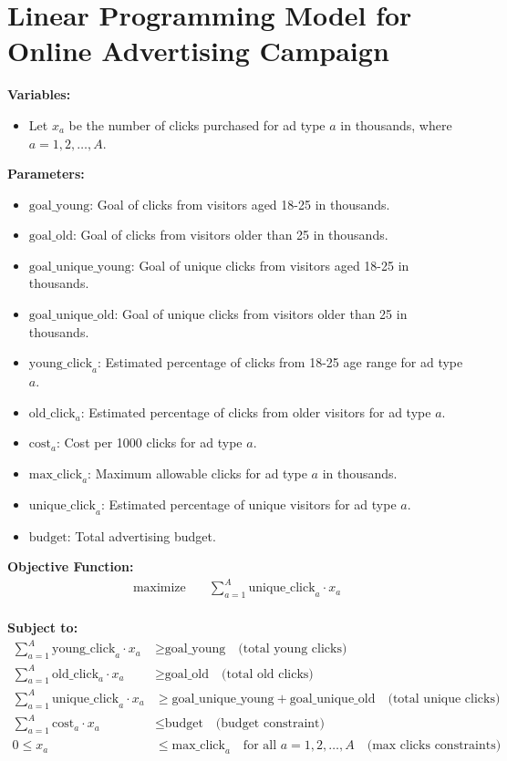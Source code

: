 \documentclass{article}
\begin{document}
\section*{Linear Programming Model for Online Advertising Campaign}

\textbf{Variables:}
\begin{itemize}
    \item Let \( x_a \) be the number of clicks purchased for ad type \( a \) in thousands, where \( a = 1, 2, \ldots, A \).
\end{itemize}

\textbf{Parameters:}
\begin{itemize}
    \item \( \text{goal\_young} \): Goal of clicks from visitors aged 18-25 in thousands.
    \item \( \text{goal\_old} \): Goal of clicks from visitors older than 25 in thousands.
    \item \( \text{goal\_unique\_young} \): Goal of unique clicks from visitors aged 18-25 in thousands.
    \item \( \text{goal\_unique\_old} \): Goal of unique clicks from visitors older than 25 in thousands.
    \item \( \text{young\_click}_{a} \): Estimated percentage of clicks from 18-25 age range for ad type \( a \).
    \item \( \text{old\_click}_{a} \): Estimated percentage of clicks from older visitors for ad type \( a \).
    \item \( \text{cost}_{a} \): Cost per 1000 clicks for ad type \( a \).
    \item \( \text{max\_click}_{a} \): Maximum allowable clicks for ad type \( a \) in thousands.
    \item \( \text{unique\_click}_{a} \): Estimated percentage of unique visitors for ad type \( a \).
    \item \( \text{budget} \): Total advertising budget.
\end{itemize}

\textbf{Objective Function:}
\begin{align*}
    \text{maximize} \quad & \sum_{a=1}^{A} \text{unique\_click}_{a} \cdot x_a \\
\end{align*}

\textbf{Subject to:}
\begin{align*}
    \sum_{a=1}^{A} \text{young\_click}_{a} \cdot x_a & \geq \text{goal\_young} \quad \text{(total young clicks)} \\
    \sum_{a=1}^{A} \text{old\_click}_{a} \cdot x_a & \geq \text{goal\_old} \quad \text{(total old clicks)} \\
    \sum_{a=1}^{A} \text{unique\_click}_{a} \cdot x_a & \geq \text{goal\_unique\_young} + \text{goal\_unique\_old} \quad \text{(total unique clicks)} \\
    \sum_{a=1}^{A} \text{cost}_{a} \cdot x_a & \leq \text{budget} \quad \text{(budget constraint)} \\
    0 \leq x_a & \leq \text{max\_click}_{a} \quad \text{for all } a = 1, 2, \ldots, A \quad \text{(max clicks constraints)} 
\end{align*}
\end{document}
